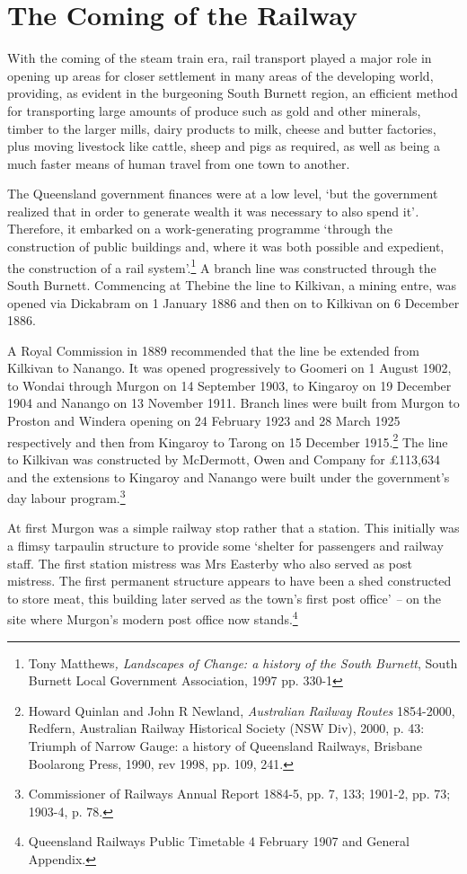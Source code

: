 \section{The Coming of the Railway}

With the coming of the steam train era, rail transport played a major
role in opening up areas for closer settlement in many areas of the
developing world, providing, as evident in the burgeoning South Burnett
region, an efficient method for transporting large amounts of produce
such as gold and other minerals, timber to the larger mills, dairy
products to milk, cheese and butter factories, plus moving livestock
like cattle, sheep and pigs as required, as well as being a much faster
means of human travel from one town to another.

The Queensland government finances were at a low level, `but the
government realized that in order to generate wealth it was necessary to
also spend it'\emph{.} Therefore, it embarked on a work-generating
programme `through the construction of public buildings and, where it
was both possible and expedient, the construction of a rail
system'.\footnote{Tony Matthews\emph{, Landscapes of Change: a history
  of the South Burnett}, South Burnett Local Government Association,
  1997 pp. 330-1} A branch line was constructed through the South
Burnett. Commencing at Thebine the line to Kilkivan, a mining entre, was
opened via Dickabram on 1 January 1886 and then on to Kilkivan on 6
December 1886.

A Royal Commission in 1889 recommended that the line be extended from
Kilkivan to Nanango. It was opened progressively to Goomeri on 1 August
1902, to Wondai through Murgon on 14 September 1903, to Kingaroy on 19
December 1904 and Nanango on 13 November 1911. Branch lines were built
from Murgon to Proston and Windera opening on 24 February 1923 and 28
March 1925 respectively and then from Kingaroy to Tarong on 15 December
1915.\footnote{Howard Quinlan and John R Newland, \emph{Australian
  Railway Routes} 1854-2000, Redfern, Australian Railway Historical
  Society (NSW Div), 2000, p. 43: Triumph of Narrow Gauge: a history of
  Queensland Railways, Brisbane Boolarong Press, 1990, rev 1998, pp.
  109, 241.} The line to Kilkivan was constructed by McDermott, Owen and
Company for \pounds113,634 and the extensions to Kingaroy and Nanango were
built under the government's day labour program.\footnote{Commissioner
  of Railways Annual Report 1884-5, pp. 7, 133; 1901-2, pp. 73; 1903-4,
  p. 78.}

At first Murgon was a simple railway stop rather that a station. This
initially was a flimsy tarpaulin structure to provide some `shelter for
passengers and railway staff. The first station mistress was Mrs
Easterby who also served as post mistress. The first permanent structure
appears to have been a shed constructed to store meat, this building
later served as the town's first post office' \emph{--} on the site
where Murgon's modern post office now stands.\footnote{Queensland
  Railways Public Timetable 4 February 1907 and General Appendix.}

